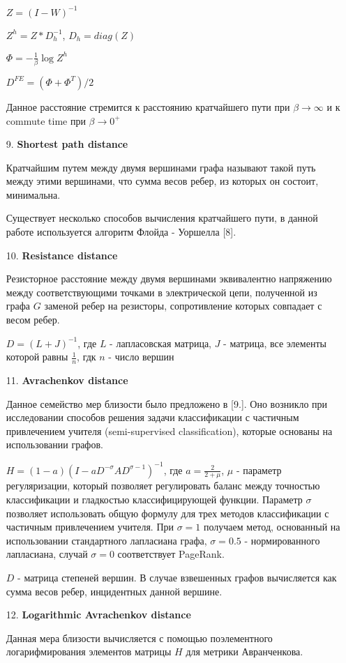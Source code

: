\begin{itemize}
$Z = (I-W)^{-1}$

$Z^h = Z * D_h^{-1}$, $D_h = diag(Z)$

$\Phi = -\frac{1}{\beta} \log Z^h$

$D^{FE} = (\Phi + \Phi ^T)/ 2$

Данное расстояние стремится к расстоянию кратчайшего пути при $\beta \rightarrow \infty$ и к commute time при $\beta \rightarrow 0^+$

\item[9.] \textbf{Shortest path distance}

Кратчайшим путем между двумя вершинами графа называют такой путь между этими вершинами, что сумма весов ребер, из которых он состоит, минимальна.

Существует несколько способов вычисления кратчайшего пути, в данной работе используется алгоритм Флойда - Уоршелла [8].

\item[10.] \textbf{Resistance distance}

Резисторное расстояние между двумя вершинами эквивалентно напряжению между соответствующими точками в электрической цепи, полученной из графа $G$ заменой ребер на резисторы, сопротивление которых совпадает с весом ребер. 

$D = (L + J)^{-1}$, где $L$ - лапласовская матрица, $J$ - матрица, все элементы которой равны $\frac {1}{n}$, гдк $n$ - число вершин

\item[11.] \textbf{Avrachenkov distance}

Данное семейство мер близости было предложено в [9.]. Оно возникло при исследовании способов решения задачи классификации с частичным привлечением учителя (semi-supervised classification), которые основаны на использовании графов. 

$H = (1 - a)(I - aD^{-\sigma}AD^{\sigma-1})^{-1}$, где $a = \frac {2}{2+\mu}$,  $\mu$ - параметр регуляризации, который позволяет регулировать баланс между точностью классификации и гладкостью классифицирующей функции. Параметр 
$\sigma$ позволяет использовать общую формулу для трех методов классификации с частичным привлечением учителя. При $\sigma = 1$ получаем метод, основанный на использовании стандартного лапласиана графа, $\sigma = 0.5$ - нормированного лапласиана,  случай $\sigma = 0$ соответствует PageRank.

$D$ - матрица степеней вершин. В случае взвешенных графов вычисляется как сумма весов ребер, инцидентных данной вершине.


\item[12.] \textbf{Logarithmic Avrachenkov distance}

Данная мера близости вычисляется с помощью поэлементного логарифмирования элементов матрицы $H$ для метрики Авранченкова. 

\end{itemize}

